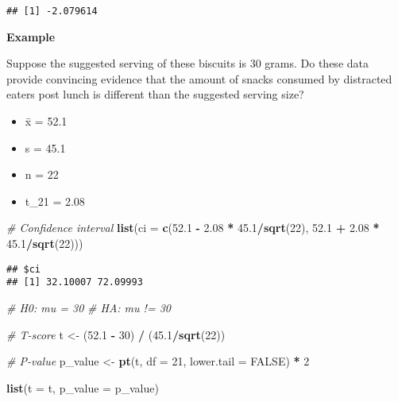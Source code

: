 \documentclass[]{book}
\newenvironment{Shaded}{\begin{snugshade}}{\end{snugshade}}
\newcommand{\CommentTok}[1]{\textcolor[rgb]{0.56,0.35,0.01}{\textit{#1}}}
\newcommand{\DataTypeTok}[1]{\textcolor[rgb]{0.13,0.29,0.53}{#1}}
\newcommand{\DecValTok}[1]{\textcolor[rgb]{0.00,0.00,0.81}{#1}}
\newcommand{\FloatTok}[1]{\textcolor[rgb]{0.00,0.00,0.81}{#1}}
\newcommand{\KeywordTok}[1]{\textcolor[rgb]{0.13,0.29,0.53}{\textbf{#1}}}
\newcommand{\NormalTok}[1]{#1}
\newcommand{\OperatorTok}[1]{\textcolor[rgb]{0.81,0.36,0.00}{\textbf{#1}}}
\newcommand{\OtherTok}[1]{\textcolor[rgb]{0.56,0.35,0.01}{#1}}
\newcommand{\StringTok}[1]{\textcolor[rgb]{0.31,0.60,0.02}{#1}}
\providecommand{\tightlist}{%
  \setlength{\itemsep}{0pt}\setlength{\parskip}{0pt}}
\begin{document}
\begin{verbatim}
## [1] -2.079614
\end{verbatim}

\textbf{Example}

Suppose the suggested serving of these biscuits is 30 grams. Do these data provide convincing evidence that the amount of snacks consumed by distracted eaters post lunch is different than the suggested serving size?

\begin{itemize}
\tightlist
\item
  x̄ = 52.1
\item
  s = 45.1
\item
  n = 22
\item
  t\_21 = 2.08
\end{itemize}

\begin{Shaded}
\begin{Highlighting}[]
\CommentTok{# Confidence interval}
\KeywordTok{list}\NormalTok{(}\DataTypeTok{ci =} \KeywordTok{c}\NormalTok{(}\FloatTok{52.1} \OperatorTok{-}\StringTok{ }\FloatTok{2.08} \OperatorTok{*}\StringTok{ }\FloatTok{45.1}\OperatorTok{/}\KeywordTok{sqrt}\NormalTok{(}\DecValTok{22}\NormalTok{), }\FloatTok{52.1} \OperatorTok{+}\StringTok{ }\FloatTok{2.08} \OperatorTok{*}\StringTok{ }\FloatTok{45.1}\OperatorTok{/}\KeywordTok{sqrt}\NormalTok{(}\DecValTok{22}\NormalTok{)))}
\end{Highlighting}
\end{Shaded}

\begin{verbatim}
## $ci
## [1] 32.10007 72.09993
\end{verbatim}

\begin{Shaded}
\begin{Highlighting}[]
\CommentTok{# H0: mu = 30}
\CommentTok{# HA: mu != 30}

\CommentTok{# T-score}
\NormalTok{t <-}\StringTok{ }\NormalTok{(}\FloatTok{52.1} \OperatorTok{-}\StringTok{ }\DecValTok{30}\NormalTok{) }\OperatorTok{/}\StringTok{ }\NormalTok{(}\FloatTok{45.1}\OperatorTok{/}\KeywordTok{sqrt}\NormalTok{(}\DecValTok{22}\NormalTok{))}

\CommentTok{# P-value}
\NormalTok{p_value <-}\StringTok{ }\KeywordTok{pt}\NormalTok{(t, }\DataTypeTok{df =} \DecValTok{21}\NormalTok{, }\DataTypeTok{lower.tail =} \OtherTok{FALSE}\NormalTok{) }\OperatorTok{*}\StringTok{ }\DecValTok{2}

\KeywordTok{list}\NormalTok{(}\DataTypeTok{t =}\NormalTok{ t, }\DataTypeTok{p_value =}\NormalTok{ p_value)}
\end{Highlighting}
\end{Shaded}
\end{document}
